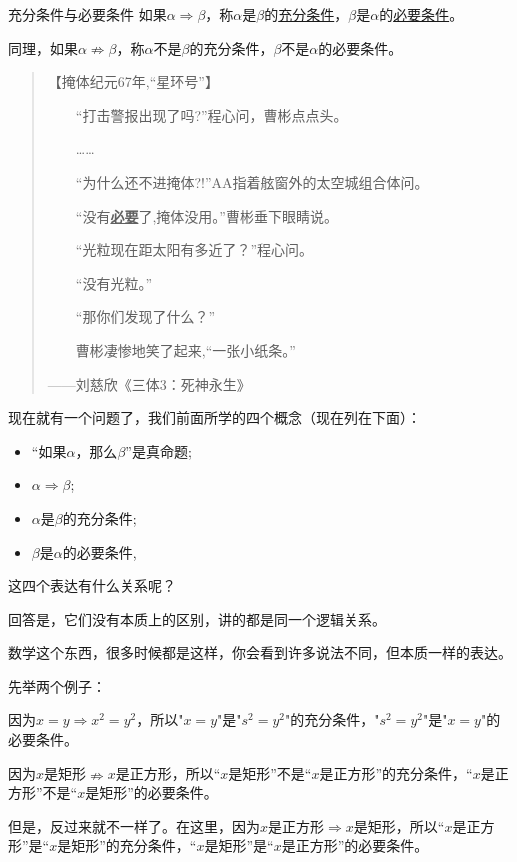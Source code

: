 \documentclass[lang=cn,math=cm,chinesefont=nofont,11pt,scheme=chinese,twocol]{elegantbook}
\begin{document}
\begin{definition}{充分条件与必要条件}
  如果$\alpha\Rightarrow\beta$，称$\alpha$是$\beta$的\underline{充分条件}，$\beta$是$\alpha$的\underline{必要条件}。

  同理，如果$\alpha\nRightarrow\beta$，称$\alpha$不是$\beta$的充分条件，$\beta$不是$\alpha$的必要条件。
\end{definition}

\begin{quotation}
  【掩体纪元67年,“星环号”】

　　“打击警报出现了吗?”程心问，曹彬点点头。

　　……

　　“为什么还不进掩体?!”AA指着舷窗外的太空城组合体问。

　　“没有\underline{\textbf{必要}}了,掩体没用。”曹彬垂下眼睛说。

　　“光粒现在距太阳有多近了？”程心问。

　　“没有光粒。”

　　“那你们发现了什么？”

　　曹彬凄惨地笑了起来,“一张小纸条。”

——刘慈欣《三体3：死神永生》
\end{quotation}

现在就有一个问题了，我们前面所学的四个概念（现在列在下面）：
\begin{itemize}
  \item “如果$\alpha$，那么$\beta$”是真命题;
  \item $\alpha\Rightarrow\beta$;
  \item $\alpha$是$\beta$的充分条件;
  \item $\beta$是$\alpha$的必要条件,
\end{itemize}

这四个表达有什么关系呢？

回答是，它们没有本质上的区别，讲的都是同一个逻辑关系。

数学这个东西，很多时候都是这样，你会看到许多说法不同，但本质一样的表达。

\hspace*{\fill}

先举两个例子：

\begin{example}\label{202406262001}
  因为$x=y\Rightarrow x^2=y^2$，所以"$x=y$"是"$s^2=y^2$"的充分条件，"$s^2=y^2$"是"$x=y$"的必要条件。
\end{example}

\begin{example}\label{202406262002}
  因为$x$是矩形$\nRightarrow x$是正方形，所以“$x$是矩形”不是“$x$是正方形”的充分条件，“$x$是正方形”不是“$x$是矩形”的必要条件。

  但是，反过来就不一样了。在这里，因为$x$是正方形$\Rightarrow x$是矩形，所以“$x$是正方形”是“$x$是矩形”的充分条件，“$x$是矩形”是“$x$是正方形”的必要条件。
\end{example}
\end{document}
